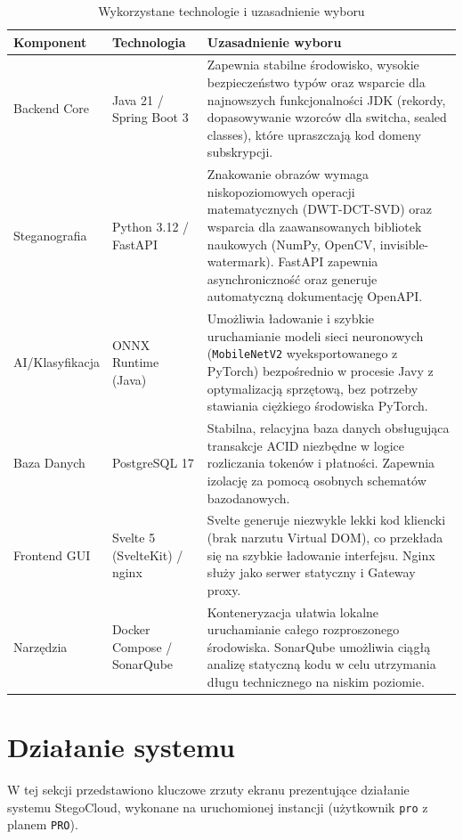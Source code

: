 \documentclass[12pt,a4paper]{article}
\begin{document}
\begin{table}[H]
\centering
\caption{Wykorzystane technologie i uzasadnienie wyboru}
\begin{tabularx}{\textwidth}{l|p{4cm}|X}
\toprule
\textbf{Komponent} & \textbf{Technologia} & \textbf{Uzasadnienie wyboru} \\
\midrule
Backend Core & Java 21 / Spring Boot 3 & Zapewnia stabilne środowisko, wysokie bezpieczeństwo typów oraz wsparcie dla najnowszych funkcjonalności JDK (rekordy, dopasowywanie wzorców dla switcha, sealed classes), które upraszczają kod domeny subskrypcji. \\
\midrule
Steganografia & Python 3.12 / FastAPI & Znakowanie obrazów wymaga niskopoziomowych operacji matematycznych (DWT-DCT-SVD) oraz wsparcia dla zaawansowanych bibliotek naukowych (NumPy, OpenCV, invisible-watermark). FastAPI zapewnia asynchroniczność oraz generuje automatyczną dokumentację OpenAPI. \\
\midrule
AI/Klasyfikacja & ONNX Runtime (Java) & Umożliwia ładowanie i szybkie uruchamianie modeli sieci neuronowych (\texttt{MobileNetV2} wyeksportowanego z PyTorch) bezpośrednio w procesie Javy z optymalizacją sprzętową, bez potrzeby stawiania ciężkiego środowiska PyTorch. \\
\midrule
Baza Danych & PostgreSQL 17 & Stabilna, relacyjna baza danych obsługująca transakcje ACID niezbędne w logice rozliczania tokenów i płatności. Zapewnia izolację za pomocą osobnych schematów bazodanowych. \\
\midrule
Frontend GUI & Svelte 5 (SvelteKit) / nginx & Svelte generuje niezwykle lekki kod kliencki (brak narzutu Virtual DOM), co przekłada się na szybkie ładowanie interfejsu. Nginx służy jako serwer statyczny i Gateway proxy. \\
\midrule
Narzędzia & Docker Compose / SonarQube & Konteneryzacja ułatwia lokalne uruchamianie całego rozproszonego środowiska. SonarQube umożliwia ciągłą analizę statyczną kodu w celu utrzymania długu technicznego na niskim poziomie. \\
\bottomrule
\end{tabularx}
\end{table}

\newpage

\section{Działanie systemu}

W tej sekcji przedstawiono kluczowe zrzuty ekranu prezentujące działanie systemu StegoCloud, wykonane na uruchomionej instancji (użytkownik \texttt{pro} z planem \texttt{PRO}).
\end{document}
